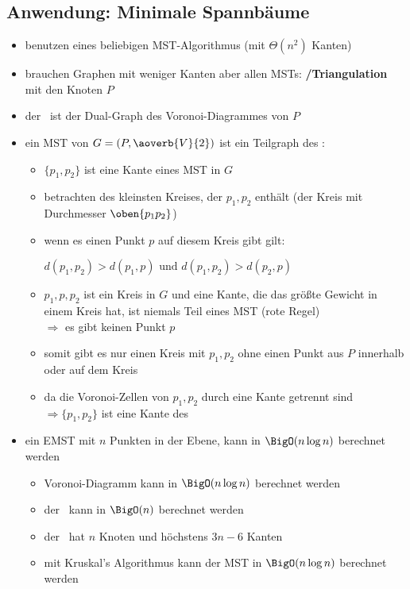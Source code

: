 \subsection{Anwendung: Minimale Spannbäume}
\begin{itemize}
	\item benutzen eines beliebigen MST-Algorithmus (mit $\Theta(n^2)$ Kanten)
	\vspace*{-.5\baselineskip}\item brauchen Graphen mit weniger Kanten aber allen MSTs: \textbf{\dg/Triangulation} mit den Knoten $P$
	\vspace*{-.5\baselineskip}\item der \dg~ist der Dual-Graph des Voronoi-Diagrammes von $P$
	\vspace*{-.5\baselineskip}\item ein MST von $G=(P, \aoverb{V}{2})$ ist ein Teilgraph des \dg:\vspace*{-1.5\baselineskip}
		\Proof\vspace*{-.5\baselineskip}
			\begin{itemize}
				\item $\{p_1,p_2\}$ ist eine Kante eines MST in $G$
				\item betrachten des kleinsten Kreises, der $p_1,p_2$ enthält (der Kreis mit Durchmesser $\oben{p_1p_2}$)
				\item wenn es einen Punkt $p$ auf diesem Kreis gibt gilt:
				\begin{center}
					$d(p_1,p_2)>d(p_1,p)\text{ und } d(p_1,p_2)>d(p_2,p)$
				\end{center}
				\item $p_1,p,p_2$ ist ein Kreis in $G$ und eine Kante, die das größte Gewicht in einem Kreis hat, ist niemals Teil eines MST (rote Regel)\\
				$\Rightarrow$ es gibt keinen Punkt $p$
				\item somit gibt es nur einen Kreis mit $p_1,p_2$ ohne einen Punkt aus $P$ innerhalb oder auf dem Kreis
				\item da die Voronoi-Zellen von $p_1,p_2$ durch eine Kante getrennt sind\\
				$\Rightarrow \{p_1,p_2\}$ ist eine Kante des \dg
			\end{itemize}
	\vspace*{-.5\baselineskip}\item ein EMST mit $n$ Punkten in der Ebene, kann in $\BigO(n\log n)$ berechnet werden\up
		\Proof\vspace*{-.5\baselineskip}
			\begin{itemize}
				\item Voronoi-Diagramm kann in $\BigO(n\log n)$ berechnet werden
				\item der \dg~kann in $\BigO(n)$ berechnet werden
				\item der \dg~hat $n$ Knoten und höchstens $3n-6$ Kanten
				\item mit Kruskal's Algorithmus kann der MST in $\BigO(n\log n)$ berechnet werden 
			\end{itemize}
\end{itemize}